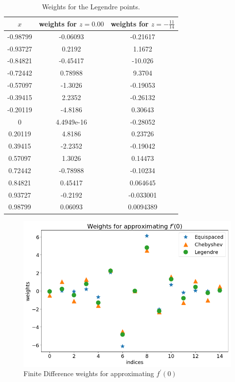 \documentclass[12pt]{article}
\begin{document}
\begin{table}[H]
	\caption{Weights for the Legendre points.}
\begin{center}
	\begin{tabular}{|c|c|c|}
		\hline
		$x$&weights for $z=0.00$&weights for $z=-\tfrac{11}{14}$\\ \hline
		-0.98799&-0.06093&-0.21617\\ \hline
		-0.93727&0.2192&1.1672\\ \hline
		-0.84821&-0.45417&-10.026\\ \hline
		-0.72442&0.78988&9.3704\\ \hline
		-0.57097&-1.3026&-0.19053\\ \hline
		-0.39415&2.2352&-0.26132\\ \hline
		-0.20119&-4.8186&0.30643\\ \hline
		0&4.4949e-16&-0.28052\\ \hline
		0.20119&4.8186&0.23726\\ \hline
		0.39415&-2.2352&-0.19042\\ \hline
		0.57097&1.3026&0.14473\\ \hline
		0.72442&-0.78988&-0.10234\\ \hline
		0.84821&0.45417&0.064645\\ \hline
		0.93727&-0.2192&-0.033001\\ \hline
		0.98799&0.06093&0.0094389\\ \hline
	\end{tabular}
\end{center} \end{table}


\begin{figure}[H]
	\caption{Finite Difference weights for approximating $f^\prime(0)$}
	\label{weights_at_0}
	\includegraphics[width=.8\textwidth]{hw1_p4b_weights_0}
	\centering
\end{figure}
\end{document}
